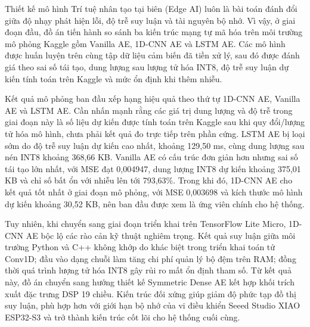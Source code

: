 Thiết kế mô hình Trí tuệ nhân tạo tại biên (Edge AI) luôn là bài toán đánh đổi giữa độ nhạy phát hiện lỗi, độ trễ suy luận và tài nguyên bộ nhớ. Vì vậy, ở giai đoạn đầu, đồ án tiến hành so sánh ba kiến trúc mạng tự mã hóa trên môi trường mô phỏng Kaggle gồm Vanilla AE, 1D-CNN AE và LSTM AE. Các mô hình được huấn luyện trên cùng tập dữ liệu cảm biến đã tiền xử lý, sau đó được đánh giá theo sai số tái tạo, dung lượng sau lượng tử hóa INT8, độ trễ suy luận dự kiến tính toán trên Kaggle và mức ổn định khi thêm nhiễu.

Kết quả mô phỏng ban đầu xếp hạng hiệu quả theo thứ tự 1D-CNN AE, Vanilla AE và LSTM AE. Cần nhấn mạnh rằng các giá trị dung lượng và độ trễ trong giai đoạn này là số liệu dự kiến được tính toán trên Kaggle sau khi quy đổi/lượng tử hóa mô hình, chưa phải kết quả đo trực tiếp trên phần cứng. LSTM AE bị loại sớm do độ trễ suy luận dự kiến cao nhất, khoảng 129,50 ms, cùng dung lượng sau nén INT8 khoảng 368,66 KB. Vanilla AE có cấu trúc đơn giản hơn nhưng sai số tái tạo lớn nhất, với MSE đạt 0,004947, dung lượng INT8 dự kiến khoảng 375,01 KB và chỉ số bất ổn với nhiễu lên tới 793,63\%. Trong khi đó, 1D-CNN AE cho kết quả tốt nhất ở giai đoạn mô phỏng, với MSE 0,003698 và kích thước mô hình dự kiến khoảng 30,52 KB, nên ban đầu được xem là ứng viên chính cho hệ thống.

Tuy nhiên, khi chuyển sang giai đoạn triển khai trên TensorFlow Lite Micro, 1D-CNN AE bộc lộ các rào cản kỹ thuật nghiêm trọng. Kết quả suy luận giữa môi trường Python và C++ không khớp do khác biệt trong triển khai toán tử Conv1D; đầu vào dạng chuỗi làm tăng chi phí quản lý bộ đệm trên RAM; đồng thời quá trình lượng tử hóa INT8 gây rủi ro mất ổn định tham số. Từ kết quả này, đồ án chuyển sang hướng thiết kế Symmetric Dense AE kết hợp khối trích xuất đặc trưng DSP 19 chiều. Kiến trúc đối xứng giúp giảm độ phức tạp đồ thị suy luận, phù hợp hơn với giới hạn bộ nhớ của vi điều khiển Seeed Studio XIAO ESP32-S3 và trở thành kiến trúc cốt lõi cho hệ thống cuối cùng.

